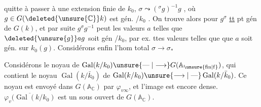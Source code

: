 quitte à passer à une extension finie de $k_0$, $\sigma\leadsto({}^{\sigma}g)^{-1}g$  , où $g\in G(\deleted{\unsure{\mathbb C}}k)$ est gén. /$k_0$ . On trouve alors pour $g^\sigma$ \uline{tt} pt gén de $G(k)$, et par suite $g^\sigma g^{-1}$ peut   les valeurs $a$ telles que $\deleted{\unsure{g}}ag$ soit gén /$k_0$, par ex. ttes valeurs telles que que   $a$ soit gén. sur $k_0(g)$.
 Considérons enfin l'hom total $\sigma\longrightarrow\sigma_*$

 Considérons le noyau de $\operatorname{Gal}(k/k_0)\unsure{\mathrel{\text{---}}|\longrightarrow}G(\mathbb A_{\unsure{\mathrm{fin}|\mathrm f}})$, qui contient le noyau $\operatorname{Gal}(k/\bar k_0)$ de $\operatorname{Gal}(k/k_0)\unsure{\longrightarrow|\mathrel{\text{---}}}\operatorname{Gal}(k/\bar k_0)$. Ce noyau est envoyé dans $G(\mathbb A_{\mathbb C})$ par $\varphi_{v\infty}$, et l'image est encore dense.
    $\overline{\varphi_v(\operatorname{Gal}(k/k_0)}$ est un sous  ouvert de $G(\mathbb A_{\mathbb C})$.
